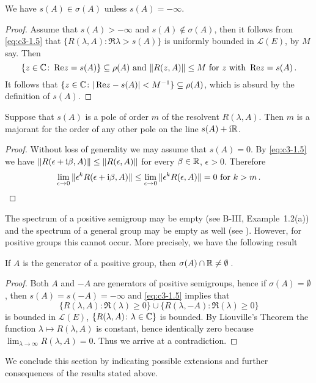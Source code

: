 \begin{corollary}\label{cor:c3-1.4}
We have $s(A) \in \sigma(A)$ unless $s(A) = -\infty$.
\end{corollary}
\begin{proof}
Assume that $s(A) > -\infty$ and $s(A) \notin \sigma(A)$, then it follows from \eqref{eq:c3-1.5} that $\{R(\lambda,A) \colon \Re \lambda > s(A)\}$ is uniformly bounded in $\mathcal{L}(E)$, by $M$ say. 
Then
\[
\{z \in \mathbb{C}  \colon \mathop{}\!\mathrm{Re}  z = s(A)\} \subseteq \rho(A) \text{ and } 
\|R(z,A)\| \leq M \text{ for } z  \text{ with } \mathop{}\!\mathrm{Re} z = s(A)\,.
\]
It follows that $\{z \in \mathbb{C}  \colon |\mathop{}\!\mathrm{Re}  z - s(A)| < M^{-1}\} \subseteq \rho(A)$, which is absurd by the definition of $s(A)$.
\end{proof}

\begin{corollary}\label{cor:c3-1.5}
Suppose that $s(A)$ is a pole of order $m$ of the resolvent $R(\lambda,A)$.
Then $m$ is a majorant for the order of any other pole on the line $s(A) + \mathrm{i}\mathbb{R} $.
\end{corollary}
\begin{proof}
Without loss of generality we may assume that $s(A) = 0$.
By \eqref{eq:c3-1.5} we have $\|R(\epsilon+\mathrm{i}\beta ,A)\| \leq \|R(\epsilon,A)\|$ for every $\beta \in \mathbb{R} $, $\epsilon > 0$.
Therefore 
\[
\lim_{\epsilon\to 0}\|\epsilon^k R(\epsilon+\mathrm{i}\beta ,A)\| \leq \lim_{\epsilon\to 0}\|\epsilon^k R(\epsilon,A)\| = 0 \text{ for } k > m\,.
\]
\end{proof}
The spectrum of a positive semigroup may be empty (see B-III, Example~1.2(a)) and the spectrum of a general group may be empty as well (see \citet[Section~23.16]{hillephillips:1957}).
However, for positive groups this cannot occur.
More precisely, we have the following result
\begin{corollary}\label{cor:c3-1.6}
If $A$ is the generator of a positive group, then $\sigma(A)\cap\mathbb{R}  \neq \emptyset$\,.
\end{corollary}
\begin{proof}
Both $A$ and $-A$ are generators of positive semigroups, hence if $\sigma(A) = \emptyset$, then $s(A) = s(-A) = -\infty$ and \eqref{eq:c3-1.5} implies that 
\[
\{R(\lambda,A) \colon \Re(\lambda) \geq 0\} \cup \{R(\lambda,-A) \colon \Re(\lambda) \geq 0\}
\]
is bounded in $\mathcal{L}(E)$, \ie  $\{R(\lambda,A) \colon \lambda \in \mathbb{C} \}$ is bounded.
By Liouville's Theorem the function $\lambda \mapsto R(\lambda,A)$ is constant, hence identically zero because $\displaystyle \lim_{\lambda\to\infty}R(\lambda,A) = 0$.
Thus we arrive at a contradiction.
\end{proof}
We conclude this section by indicating possible extensions and further consequences of the results stated above.

